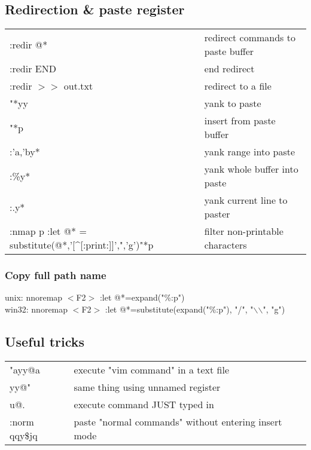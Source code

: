 \subsection{Redirection \& paste register}
\begin{center}
\begin{longtable}{l|l}
 :redir @* & redirect commands to paste buffer\\
 :redir END & end redirect\\
 :redir $>$$>$ out.txt & redirect to a file\\
 "*yy & yank to paste\\
 "*p & insert from paste buffer\\
 :'a,'by* & yank range into paste\\
 :\%y* & yank whole buffer into paste\\
 :.y* & yank current line to paster\\
 :nmap p :let @* = substitute(@*,'[\^{}[:print:]]',",'g')"*p & filter non-printable characters\
\end{longtable}
\end{center}

\subsubsection{Copy full path name}
unix: nnoremap $<$F2$>$ :let @*=expand("\%:p")\\
win32: nnoremap $<$F2$>$ :let @*=substitute(expand("\%:p"), "/", "$\backslash$$\backslash$", "g")

\subsection{Useful tricks}
\begin{center}
\begin{longtable}{l|l}
 "ayy@a & execute "vim command" in a text file\\
 yy@" & same thing using unnamed register\\
 u@. & execute command JUST typed in\\
 :norm qqy\$jq &  paste "normal commands" without entering insert mode
 \end{longtable}
\end{center}
